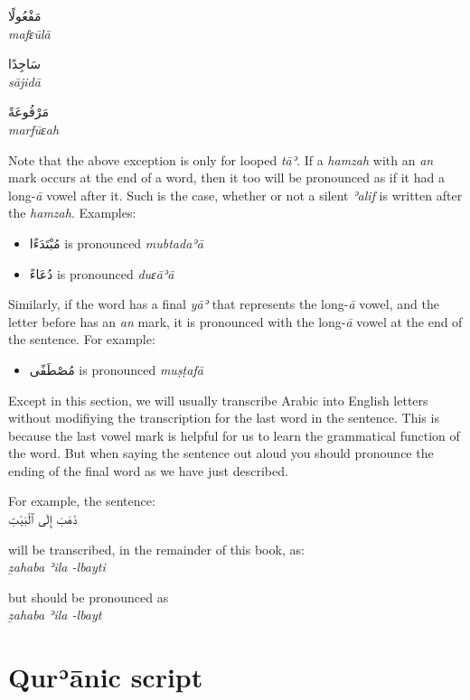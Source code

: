 \documentclass[
  10pt,
]{book}
\providecommand{\tightlist}{%
  \setlength{\itemsep}{0pt}\setlength{\parskip}{0pt}}
\begin{document}
\foreignlanguage{arabic}{مَفْعُولًا}\\
\emph{mafɛūlā}

\foreignlanguage{arabic}{سَاجِدًا}\\
\emph{sājidā}

\foreignlanguage{arabic}{مَرْفُوعَةً}\\
\emph{marfūɛah}

Note that the above exception is only for looped \emph{tāʾ}. If a \emph{hamzah} with an \emph{an} mark occurs at the end of a word, then it too will be pronounced as if it had a long-\emph{ā} vowel after it. Such is the case, whether or not a silent \emph{ʾalif} is written after the \emph{hamzah}. Examples:

\begin{itemize}
\tightlist
\item
  \foreignlanguage{arabic}{مُبْتَدَءًا} is pronounced \emph{mubtadaʾā}
\item
  \foreignlanguage{arabic}{دُعَاءً} is pronounced \emph{duɛāʾā}
\end{itemize}

Similarly, if the word has a final \emph{yāʾ} that represents the long-\emph{ā} vowel, and the letter before has an \emph{an} mark, it is pronounced with the long-\emph{ā} vowel at the end of the sentence. For example:

\begin{itemize}
\tightlist
\item
  \foreignlanguage{arabic}{مُصْطَفًى} is pronounced \emph{muṣṭafā}
\end{itemize}

Except in this section, we will usually transcribe Arabic into English letters without modifiying the transcription for the last word in the sentence. This is because the last vowel mark is helpful for us to learn the grammatical function of the word. But when saying the sentence out aloud you should pronounce the ending of the final word as we have just described.

For example, the sentence:\\
\foreignlanguage{arabic}{ذَهَبَ إِلَى ٱلْبَيْتِ}

will be transcribed, in the remainder of this book, as:\\
\emph{ẕahaba ʾila -lbayti}

but should be pronounced as\\
\emph{ẕahaba ʾila -lbayt}

\section{Qurʾānic script}\label{qureanic-script}
\end{document}
